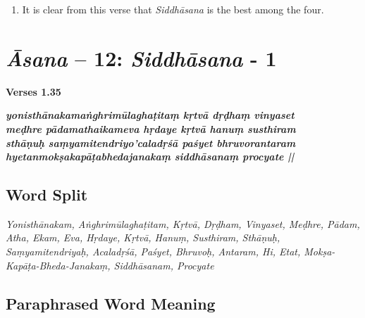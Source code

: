 \begin{enumerate}
\item It is clear from this verse that \textit{Siddhāsana} is the best among the four. 
\end{enumerate}

\section*{\textit{Āsana} -- 12: \textit{Siddhāsana} - 1}

\noindent 
\textbf{Verses 1.35}

\begin{shloka}
\textit{\textbf{yonisthānakamaṅghrimūlaghaṭitaṃ kṛtvā dṛḍhaṃ vinyaset}\\
\textbf{meḍhre pādamathaikameva hṛdaye kṛtvā hanuṃ susthiram}\\
\textbf{sthāṇuḥ saṃyamitendriyo'caladṛśā paśyet bhruvorantaram}\\
\textbf{hyetanmokṣakapāṭabhedajanakaṃ siddhāsanaṃ procyate ||}}
\end{shloka}

\subsection*{Word Split}

\textit{Yonisthānakam, Aṅghrimūlaghaṭitam, Kṛtvā, Dṛḍham, Vinyaset, Meḍhre, Pādam, Atha, Ekam, Eva, Hṛdaye, Kṛtvā, Hanuṃ, Susthiram, Sthāṇuḥ, Saṃyamitendriyaḥ, Acaladṛśā, Paśyet, Bhruvoḥ, Antaram, Hi, Etat, Mokṣa-Kapāṭa-Bheda-Janakaṃ, Siddhāsanam, Procyate}

\subsection*{Paraphrased Word Meaning}

